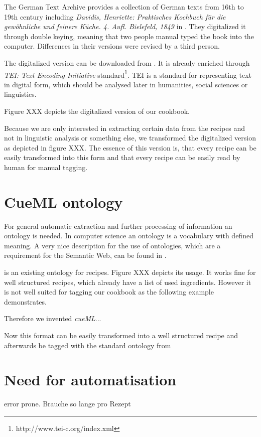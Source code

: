 \documentclass[12pt, twoside]{report}
\begin{document}
The German Text Archive provides a collection of German texts from 16th to 19th century including \textit{Davidis, Henriette: Praktisches Kochbuch für die gewöhnliche und feinere Küche. 4. Aufl. Bielefeld, 1849} in \parencite{DTA}. They digitalized it through double keying, meaning that two people manual typed the book into the computer. Differences in their versions were revised by a third person.

The digitalized version can be downloaded from \parencite{DTA}. It is already enriched through \textit{TEI: Text Encoding Initiative}-standard\footnote{http://www.tei-c.org/index.xml}. TEI is a standard for representing text in digital form, which should be analysed later in humanities, social sciences or linguistics.

Figure XXX depicts the digitalized version of our cookbook.

Because we are only interested in extracting certain data from the recipes and not in linguistic analysis or something else, we transformed the digitalized version as depicted in figure XXX. The essence of this version is, that every recipe can be easily transformed into this form and that every recipe can be easily read by human for manual tagging. 

\section{CueML ontology}
For general automatic extraction and further processing of information an ontology is needed. In computer science an ontology is a vocabulary with defined meaning. A very nice description for the use of ontologies, which are a requirement for the Semantic Web, can be found in \parencite{semanticWeb}.

\parencite{schemaRecipe} is an existing ontology for recipes. Figure XXX depicts its usage. It works fine for well structured recipes, which already have a list of used ingredients. However it is not well suited for tagging our cookbook as the following example demonstrates.

Therefore we invented \textit{cueML}...

Now this format can be easily transformed into a well structured recipe and afterwards be tagged with the standard ontology from \parencite{schemaRecipe}


\section{Need for automatisation}
\parencite{manualTagging} error prone. Brauche so lange pro Rezept
\end{document}
